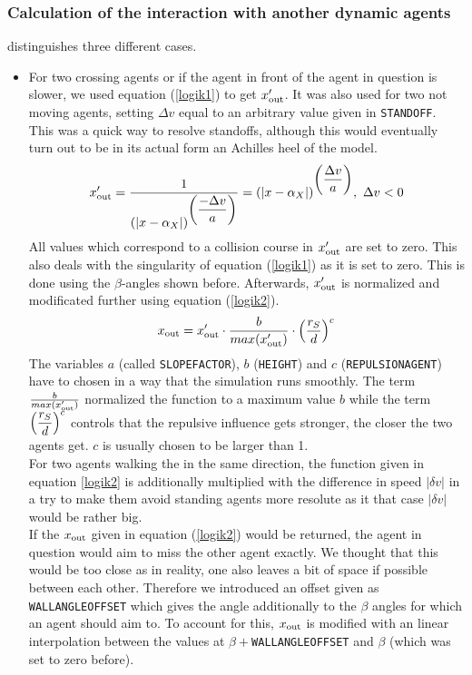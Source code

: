 \subsubsection{Calculation of the interaction with another dynamic agents}
 distinguishes three different cases.
\begin{itemize}
	\item For two crossing agents or if the agent in front of the agent in question is slower, we used equation (\ref{logik1}) to get $x_{\text{out}}'$. It was also used for two not moving agents, setting $\Delta v$ equal to an arbitrary value given in \texttt{STANDOFF}. This was a quick way to resolve standoffs, although this would eventually turn out to be in its actual form an Achilles heel of the model.
	\begin{equation}\label{logik1}
		x_{\text{out}}' = \frac{1}{\displaystyle (|x - \alpha_X|)^{\displaystyle \left(\frac{-\Delta v}{a}\right)}} = (|x - \alpha_X|)^{\displaystyle \left(\frac{\Delta v}{a}\right)},\ \Delta v < 0
	\end{equation}
	\noi All values which correspond to a collision course in $x_{\text{out}}'$ are set to zero. This also deals with the singularity of equation (\ref{logik1}) as it is set to zero. This is done using the $\beta$-angles shown before. Afterwards, $x_{\text{out}}'$ is normalized and modificated further using equation (\ref{logik2}).
	\begin{equation}\label{logik2}
		x_{\text{out}} = x_{\text{out}}' \cdot \frac{b}{max(x_{\text{out}}')} \cdot \displaystyle \left(\frac{r_S}{d}\right)^c
	\end{equation}
	\noi The variables $a$ (called \texttt{SLOPEFACTOR}), $b$ (\texttt{HEIGHT}) and $c$ (\texttt{REPULSIONAGENT}) have to chosen in a way that the simulation runs smoothly. The term $\frac{b}{max(x_{\text{out}}')}$ normalized the function to a maximum value $b$ while the term $\displaystyle \left(\frac{r_S}{d}\right)^c$ controls that the repulsive influence gets stronger, the closer the two agents get. $c$ is usually chosen to be larger than 1.\\
	For two agents walking the in the same direction, the function given in equation \ref{logik2} is additionally multiplied with the difference in speed $|\delta v|$ in a try to make them avoid standing agents more resolute as it that case $|\delta v|$ would be rather big.\\
	
	\noi If the $x_{\text{out}}$ given in equation (\ref{logik2}) would be returned, the agent in question would aim to miss the other agent exactly. We thought that this would be too close as in reality, one also leaves a bit of space if possible between each other. Therefore we introduced an offset given as \texttt{WALLANGLEOFFSET} which gives the angle additionally to the $\beta$ angles for which an agent should aim to. To account for this, $x_{\text{out}}$ is modified with an linear interpolation between the values at $\beta + $\texttt{WALLANGLEOFFSET} and $\beta$ (which was set to zero before).


\end{itemize}
